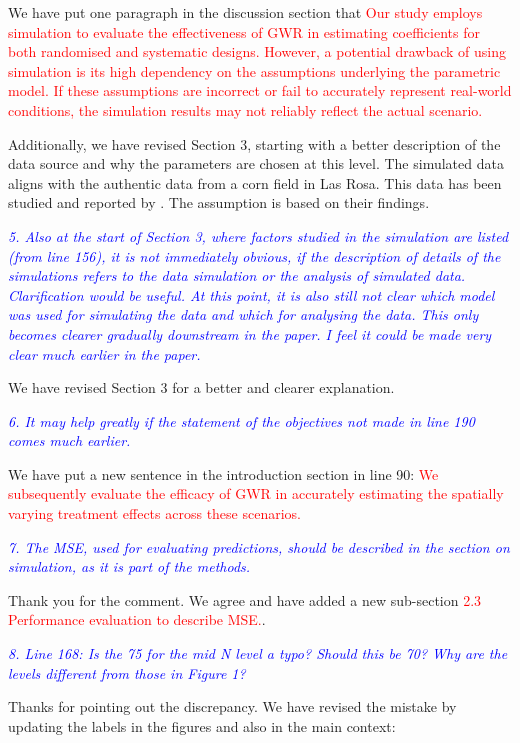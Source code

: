 \documentclass[a4paper]{article}   	%
\newcommand{\revision}[1]{\textcolor{red}{#1}}
\newcommand{\reviewer}[1]{\textcolor{blue}{\textit{#1}}}
\begin{document}
We have put one paragraph in the discussion section that 
\revision{Our study employs simulation to evaluate the effectiveness of GWR in estimating coefficients for both randomised and systematic designs. However, a potential drawback of using simulation is its high dependency on the assumptions underlying the parametric model. If these assumptions are incorrect or fail to accurately represent real-world conditions, the simulation results may not reliably reflect the actual scenario.}

Additionally, we have revised Section 3, starting with a better description of the data source and why the parameters are chosen at this level. The simulated data aligns with the authentic data from a corn field in Las Rosa. This data has been studied and reported by \textcite{Rakshit2020Novel, Cao2022Bayesian}. The assumption is based on their findings. 



\reviewer{5. Also at the start of Section 3, where factors studied in the simulation are listed (from line 156), it is not immediately obvious, if the description of details of the simulations refers to the data simulation or the analysis of simulated data. Clarification would be useful. At this point, it is also still not clear which model was used for simulating the data and which for analysing the data. This only becomes clearer gradually downstream in the paper. I feel it could be made very clear much earlier in the paper.}

We have revised Section 3 for a better and clearer explanation. 


\reviewer{6. It may help greatly if the statement of the objectives not made in line 190 comes much earlier.}

We have put a new sentence in the introduction section in line 90: \revision{We subsequently evaluate the efficacy of GWR in accurately estimating the spatially varying treatment effects across these scenarios.}


\reviewer{7. The MSE, used for evaluating predictions, should be described in the section on simulation, as it is part of the methods.}

Thank you for the comment. We agree and have added a new sub-section \revision{2.3 Performance evaluation to describe MSE.}.


\reviewer{8. Line 168: Is the 75 for the mid N level a typo? Should this be 70? Why are the levels different from those in Figure 1?}

Thanks for pointing out the discrepancy. We have revised the mistake by updating the labels in the figures and also in the main context: 
\end{document}
